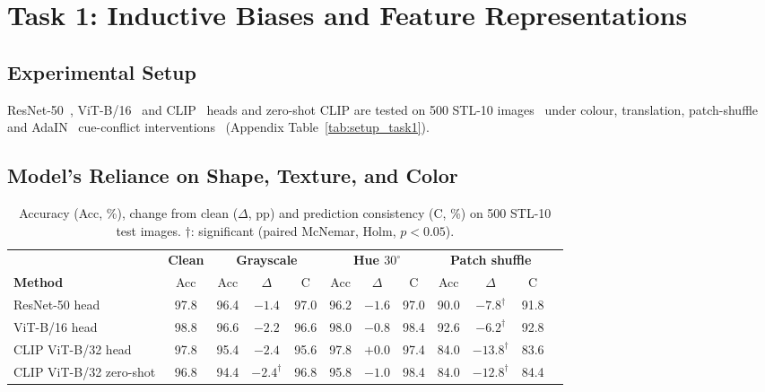 \section{Task 1: Inductive Biases and Feature Representations}

\subsection{Experimental Setup}
ResNet-50~\citep{he2016resnet}, ViT-B/16~\citep{dosovitskiy2021vit} and CLIP~\citep{radford2021clip} heads and zero-shot CLIP are tested on 500 STL-10 images~\citep{coates2011stl10} under colour, translation, patch-shuffle and AdaIN~\citep{huang2017adain} cue-conflict interventions~\citep{geirhos2019texture} (Appendix Table~\ref{tab:setup_task1}).

\subsection{Model's Reliance on Shape, Texture, and Color}

\begin{table}[h]
  \caption{Accuracy (Acc, \%), change from clean ($\Delta$, pp) and prediction consistency (C, \%) on 500 STL-10 test images. $\dagger$: significant (paired McNemar, Holm, $p<0.05$).}
  \label{tab:task1_interventions}
  \centering
  \small
  \setlength{\tabcolsep}{4pt}
  \begin{tabular}{lccccccccccc}
    \toprule
    & \textbf{Clean} & \multicolumn{3}{c}{\textbf{Grayscale}} & \multicolumn{3}{c}{\textbf{Hue $30^{\circ}$}} & \multicolumn{3}{c}{\textbf{Patch shuffle}} \\
    \cmidrule(lr){2-2} \cmidrule(lr){3-5} \cmidrule(lr){6-8} \cmidrule(l){9-11}
    \textbf{Method} & Acc & Acc & $\Delta$ & C & Acc & $\Delta$ & C & Acc & $\Delta$ & C \\
    \midrule
    ResNet-50 head       & 97.8 & 96.4 & $-1.4$ & 97.0 & 96.2 & $-1.6$ & 97.0 & 90.0 & $-7.8^{\dagger}$  & 91.8 \\
    ViT-B/16 head        & 98.8 & 96.6 & $-2.2$ & 96.6 & 98.0 & $-0.8$ & 98.4 & 92.6 & $-6.2^{\dagger}$  & 92.8 \\
    CLIP ViT-B/32 head   & 97.8 & 95.4 & $-2.4$ & 95.6 & 97.8 & $+0.0$ & 97.4 & 84.0 & $-13.8^{\dagger}$ & 83.6 \\
    CLIP ViT-B/32 zero-shot & 96.8 & 94.4 & $-2.4^{\dagger}$ & 96.8 & 95.8 & $-1.0$ & 98.4 & 84.0 & $-12.8^{\dagger}$ & 84.4 \\
    \bottomrule
  \end{tabular}
\end{table}

